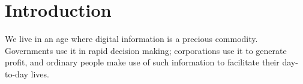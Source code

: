 \documentclass{l4proj}
\begin{document}
\tableofcontents

%
%
%

%
%
%
%
\chapter{Introduction}





We live in an age where digital information is a precious commodity. Governments use it in rapid decision making; corporations use it to generate profit, and ordinary people make use of such information to facilitate their day-to-day lives.
\end{document}
